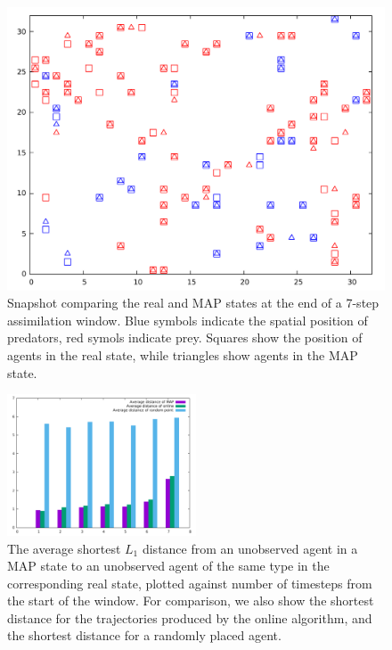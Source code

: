 \documentclass[sigconf]{aamas}
\begin{document}
\begin{figure}
\begin{center}
\includegraphics[width = \textwidth]{snapshot7steps.pdf}
\end{center}
\caption{Snapshot comparing the real and MAP states at the end of a 7-step assimilation window. Blue symbols indicate the spatial position of predators, red symols indicate prey. Squares show the position of agents in the real state, while triangles show agents in the MAP state.}
\label{snapshot}
\end{figure}

\begin{figure}
\begin{center}
\includegraphics[width = 0.5\textwidth]{distances2.pdf}
\end{center}
\caption{The average shortest $L_1$ distance from an unobserved agent in a MAP state to an unobserved agent of the same type in the corresponding real state, plotted against number of timesteps from the start of the window. For comparison, we also show the shortest distance for the trajectories produced by the online algorithm, and the shortest distance for a randomly placed agent.}
\label{distance}
\end{figure}
\end{document}
